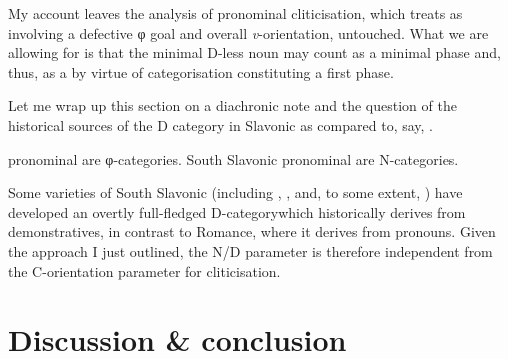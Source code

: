 \documentclass[output=paper]{langsci/langscibook}
\begin{document}
My account leaves the analysis of  pronominal
cliticisation, which \textcite{Roberts2010} treats as involving a
defective φ goal and overall \emph{v}-orientation, untouched. What we are
allowing for is that the minimal D-less noun may count as a minimal
phase and, thus, as a  by virtue of
categorisation constituting a first phase.

Let me wrap up this section on a diachronic note and the question of the
historical sources of the D category in Slavonic as compared to, say,
.

\begin{exe}
	\ex
	\begin{xlista}
	\ex {} pronominal  are φ-categories.
	\ex South Slavonic pronominal  are N-categories.
	\end{xlista}
\end{exe}

Some varieties of South Slavonic (including , ,
and, to some extent, ) have developed an overtly full-fledged
D-category\linebreak which historically derives from demonstratives, in
contrast to Romance, where it derives from pronouns. Given the approach I just
outlined, the N/D parameter is therefore independent from the C-orientation
parameter for cliticisation.

%
%
%
%

\section{Discussion \& conclusion}
\end{document}
